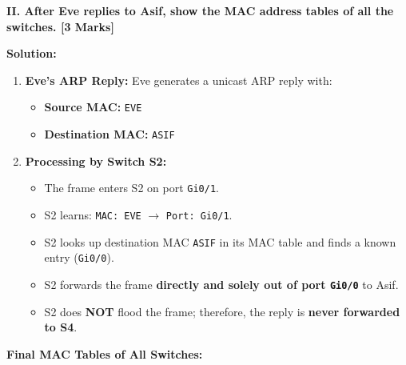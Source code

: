 \documentclass[11pt,a4paper]{article}
\begin{document}
\vspace{0.2cm}
\textbf{II. After Eve replies to Asif, show the MAC address tables of all the switches. [3 Marks]}

\textbf{Solution:}
\begin{enumerate}
    \item \textbf{Eve's ARP Reply:}
    Eve generates a unicast ARP reply with:
    \begin{itemize}
        \item \textbf{Source MAC:} \texttt{EVE}
        \item \textbf{Destination MAC:} \texttt{ASIF}
    \end{itemize}
    \item \textbf{Processing by Switch S2:}
    \begin{itemize}
        \item The frame enters S2 on port \texttt{Gi0/1}.
        \item S2 learns: \texttt{MAC: EVE} $\to$ \texttt{Port: Gi0/1}.
        \item S2 looks up destination MAC \texttt{ASIF} in its MAC table and finds a known entry (\texttt{Gi0/0}).
        \item S2 forwards the frame \textbf{directly and solely out of port \texttt{Gi0/0}} to Asif.
        \item S2 does \textbf{NOT} flood the frame; therefore, the reply is \textbf{never forwarded to S4}.
    \end{itemize}
\end{enumerate}

\textbf{Final MAC Tables of All Switches:}
\end{document}
